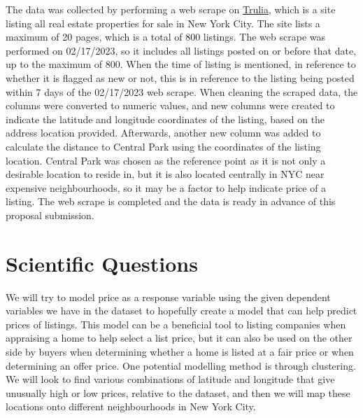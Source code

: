 \documentclass[11pt, a4paper]{article}
\begin{document}
The data was collected by performing a web scrape on \href{https://www.trulia.com/NY/New_York/20_p/}{Trulia}, which is a site listing all real estate properties for sale in New York City. The site lists a maximum of 20 pages, which is a total of 800 listings. The web scrape was performed on 02/17/2023, so it includes all listings posted on or before that date, up to the maximum of 800. When the time of listing is mentioned, in reference to whether it is flagged as new or not, this is in reference to the listing being posted within 7 days of the 02/17/2023 web scrape. When cleaning the scraped data, the columns were converted to numeric values, and new columns were created to indicate the latitude and longitude coordinates of the listing, based on the address location provided. Afterwards, another new column was added to calculate the distance to Central Park using the coordinates of the listing location. Central Park was chosen as the reference point as it is not only a desirable location to reside in, but it is also located centrally in NYC near expensive neighbourhoods, so it may be a factor to help indicate price of a listing. The web scrape is completed and the data is ready in advance of this proposal submission.


\section{Scientific Questions}

We will try to model price as a response variable using the given dependent variables we have in the dataset to hopefully create a model that can help predict prices of listings. This model can be a beneficial tool to listing companies when appraising a home to help select a list price, but it can also be used on the other side by buyers when determining whether a home is listed at a fair price or when determining an offer price. One potential modelling method is through clustering. We will look to find various combinations of latitude and longitude that give unusually high or low prices, relative to the dataset, and then we will map these locations onto different neighbourhoods in New York City.
\end{document}
